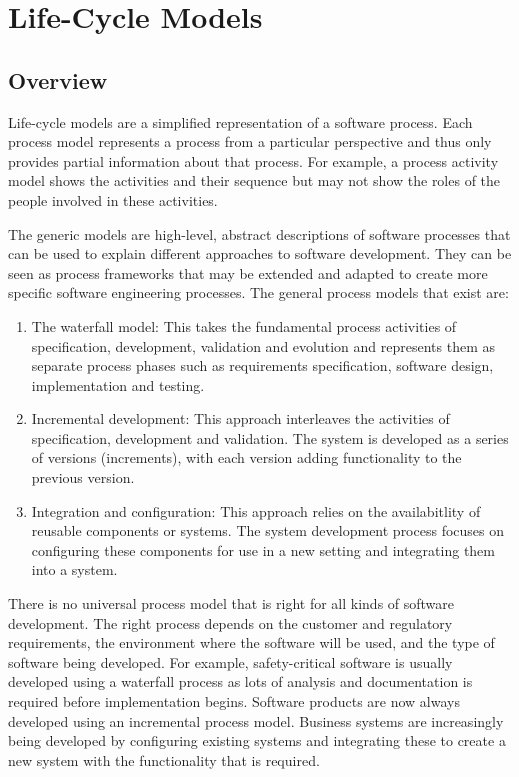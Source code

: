 \chapter{Life-Cycle Models}
\section{Overview}
Life-cycle models are a simplified representation of a software process. Each process model represents a process from a particular perspective and thus only provides partial information about that process. For example, a process activity model shows the activities and their sequence but may not show the roles of the people involved in these activities.

The generic models are high-level, abstract descriptions of software processes that can be used to explain different approaches to software development. They can be seen as process frameworks that may be extended and adapted to create more specific software engineering processes. The general process models that exist are:

\begin{enumerate}
    \item The waterfall model: This takes the fundamental process activities of specification, development, validation and evolution and represents them as separate process phases such as requirements specification, software design, implementation and testing.
    \item Incremental development: This approach interleaves the activities of specification, development and validation. The system is developed as a series of versions (increments), with each version adding functionality to the previous version.
    \item Integration and configuration: This approach relies on the availabitlity of reusable components or systems. The system development process focuses on configuring these components for use in a new setting and integrating them into a system.
\end{enumerate}

There is no universal process model that is right for all kinds of software development. The right process depends on the customer and regulatory requirements, the environment where the software will be used, and the type of software being developed. For example, safety-critical software is usually developed using a waterfall process as lots of analysis and documentation is required before implementation begins. Software products are now always developed using an incremental process model. Business systems are increasingly being developed by configuring existing systems and integrating these to create a new system with the functionality that is required.

